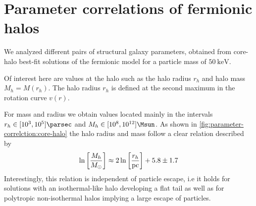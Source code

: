 \section{Parameter correlations of fermionic halos}
\label{sec:parameter-correlations}

We analyzed different pairs of structural galaxy parameters, obtained from core-halo best-fit solutions of the fermionic model for a particle mass of $\SI{50}{\kilo\eV}$.

Of interest here are values at the halo such as the halo radius $r_h$ and halo mass $M_h = M(r_h)$. The halo radius $r_h$ is defined at the second maximum in the rotation curve $v(r)$.

For mass and radius we obtain values located mainly in the intervals $r_h \in [10^3,10^5]\si{\parsec}$ and $M_h \in [10^8,10^{12}] \si{\Msun}$. As shown in \cref{fig:parameter-correlction:core-halo} the halo radius and mass follow a clear relation described by \begin{equation}
	\label{eqn:rel:Mh-rh}
	\ln \qbracket{\frac{M_h}{M_\odot}} \approx 2\ln \qbracket{\frac{r_h}{\mathrm{pc}}} + 5.8 \pm 1.7
\end{equation} Interestingly, this relation is independent of particle escape, i.e it holds for solutions with an isothermal-like halo developing a flat tail as well as for polytropic non-isothermal halos implying a large escape of particles.


